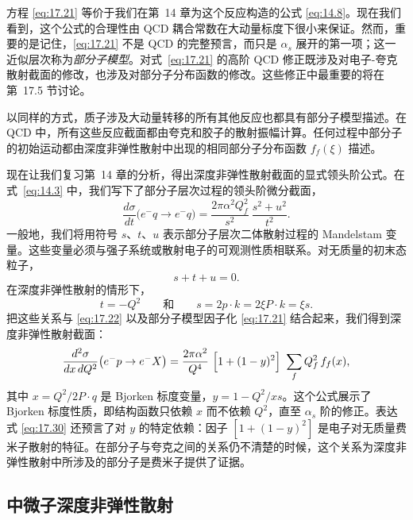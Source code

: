 方程 \eqref{eq:17.21} 等价于我们在第~14 章为这个反应构造的公式 \eqref{eq:14.8}。现在我们看到，这个公式的合理性由 QCD 耦合常数在大动量标度下很小来保证。然而，重要的是记住，\eqref{eq:17.21} 不是 QCD 的完整预言，而只是 $\alpha_s$ 展开的第一项；这一近似层次称为\emph{部分子模型}。对式~\eqref{eq:17.21} 的高阶 QCD 修正既涉及对电子-夸克散射截面的修改，也涉及对部分子分布函数的修改。这些修正中最重要的将在第~17.5 节讨论。

以同样的方式，质子涉及大动量转移的所有其他反应也都具有部分子模型描述。在 QCD 中，所有这些反应截面都由夸克和胶子的散射振幅计算。任何过程中部分子的初始运动都由深度非弹性散射中出现的相同部分子分布函数 $f_f(\xi)$ 描述。

现在让我们复习第~14 章的分析，得出深度非弹性散射截面的显式领头阶公式。在式~\eqref{eq:14.3} 中，我们写下了部分子层次过程的领头阶微分截面，
\begin{equation}
  \frac{d\sigma}{dt}\bigl( e^{-}q \to e^{-}q \bigr)
  = \frac{2\pi\alpha^2 Q_f^2}{s^2}\ \frac{s^2 + u^2}{t^2} .
  \label{eq:17.22}
\end{equation}
一般地，我们将用符号 $s$、$t$、$u$ 表示部分子层次二体散射过程的 Mandelstam 变量。这些变量必须与强子系统或散射电子的可观测性质相联系。对无质量的初末态粒子，
\begin{equation}
  s + t + u = 0 .
\end{equation}
在深度非弹性散射的情形下，
\begin{equation}
  t = -Q^2
  \qquad\text{和}\qquad
  s = 2p\cdot k = 2\xi P\cdot k = \xi s .
\end{equation}
把这些关系与 \eqref{eq:17.22} 以及部分子模型因子化 \eqref{eq:17.21} 结合起来，我们得到深度非弹性散射截面：
\begin{equation}
  \frac{d^2\sigma}{dx\,dQ^2}\bigl( e^{-}p \to e^{-}X \bigr)
  = \frac{2\pi\alpha^2}{Q^4}\ \Bigl[ 1 + (1-y)^2 \Bigr]\ \sum_f Q_f^2\,
    f_f(x) ,
  \label{eq:17.30}
\end{equation}
其中 $x = Q^2/2P\cdot q$ 是 Bjorken 标度变量，$y = 1 - Q^2/xs$。这个公式展示了 Bjorken 标度性质，即结构函数只依赖 $x$ 而不依赖 $Q^2$，直至 $\alpha_s$ 阶的修正。表达式 \eqref{eq:17.30} 还预言了对 $y$ 的特定依赖：因子 $[1 + (1-y)^2]$ 是电子对无质量费米子散射的特征。在部分子与夸克之间的关系仍不清楚的时候，这个关系为深度非弹性散射中所涉及的部分子是费米子提供了证据。

\subsection{中微子深度非弹性散射}

